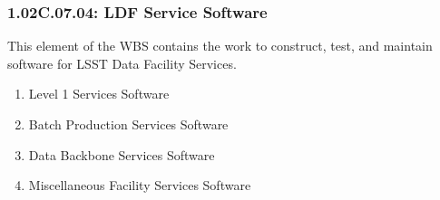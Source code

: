 \subsubsection{1.02C.07.04: LDF Service Software}

This element of the WBS contains the work to construct, test, and maintain software for LSST Data Facility Services.

\begin{enumerate}

  \item{Level 1 Services Software}
  \item{Batch Production Services Software}
  \item{Data Backbone Services Software}
  \item{Miscellaneous Facility Services Software}

\end{enumerate}

